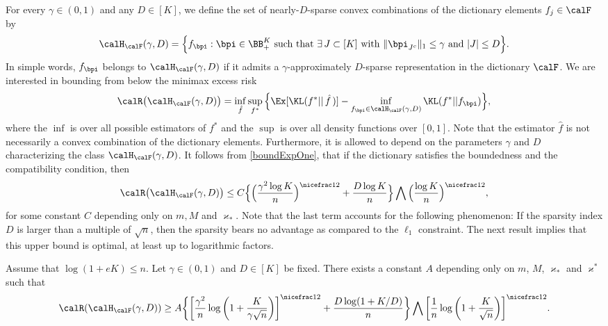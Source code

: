 For every $\gamma \in (0,1)$  and any $D\in [K]$, we define the set of nearly-$D$-sparse
convex combinations of the dictionary elements $f_j\in\calF$ by
\begin{equation}
\calH_\calF(\gamma,D) = \Big\{f_{\bpi} : \bpi\in\BB^K_+ \text{ such that }\exists \, J\subset [K]
\text{ with } \|\bpi_{J^c}\|_1\le \gamma \text{ and } |J|\le D\Big\}.
\end{equation}
In simple words, $f_{\bpi}$ belongs to $\calH_\calF(\gamma,D)$ if it admits a $\gamma$-approximately
$D$-sparse representation in the dictionary $\calF$. We are interested in bounding  from
below the minimax excess risk
\begin{equation}
\calR\big(\calH_\calF(\gamma,D)\big) = \inf_{\hat f} \sup_{f^*}
\Big\{\Ex[\KL(f^*||\,\hat f\,)] - \inf_{f_{\bpi}\in \calH_\calF(\gamma,D)} \KL(f^*|| f_{\bpi})\Big\},
\end{equation}
where the $\inf$ is over all possible estimators of $f^*$ and the $\sup$ is over all density functions
over $[0,1]$. Note that the estimator $\hat f$ is not necessarily a convex combination of the
dictionary elements. Furthermore, it is allowed to depend on the parameters $\gamma$ and $D$
characterizing the class $\calH_\calF(\gamma,D)$. It follows from \eqref{boundExpOne}, that if
the dictionary satisfies the boundedness and the compatibility condition, then
\begin{equation}\label{upper}
\calR\big(\calH_\calF(\gamma,D)\big) \le C \Big\{\Big(\frac{\gamma^2\log K}{n}\Big)^{\nicefrac12} + \frac{D\log K}{n}\Big\}\bigwedge \Big(\frac{\log K}{n}\Big)^{\nicefrac12},
\end{equation}
for some constant $C$ depending only on $m,M$ and $\varkappa_*$. Note that the last term  
accounts for the following phenomenon: If the sparsity index $D$ is larger than a multiple 
of $\sqrt{n}$, then the sparsity bears no advantage as compared to the $\ell_1$ constraint. 
The next result implies that this upper bound is optimal, at least up to logarithmic 
factors.

\begin{theorem}
\label{theorem:lower_bound}
Assume that $\log(1+eK)\le n$. Let $\gamma\in(0,1)$ and $D\in[K]$ be fixed. There exists 
a constant $A$ depending only on $m$, $M$, $\varkappa_*$ and  $\varkappa^*$ such that 
\begin{equation}
\calR(\calH_\calF(\gamma,D)) \ge A \bigg\{\bigg[\frac{\gamma^2}{n}
\log\bigg(1+\frac{K}{\gamma\sqrt{n}}\bigg)\bigg]^{\nicefrac12}
+ \frac{D\log(1+K/D)}{n}\bigg\}\bigwedge \bigg[\frac{1}{n}
\log\bigg(1+\frac{K}{\sqrt{n}}\bigg)\bigg]^{\nicefrac12}.
\end{equation}
\end{theorem}

